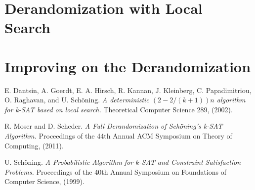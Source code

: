 \documentclass{article}
\begin{document}
\section{Derandomization with Local Search\cite{Dantsin02}}
\section{Improving on the Derandomization\cite{Moser11}}

\begin{thebibliography}{9}
E. Dantsin, A. Goerdt, E. A. Hirsch, R. Kannan, J. Kleinberg, C. Papadimitriou, O. Raghavan, and U. Sch\"{o}ning. 
\textit{A deterministic $(2-2/(k+1))n$ algorithm for k-SAT based on local search.} Theoretical Computer Science 289, (2002).

R. Moser and D. Scheder.
\textit{A Full Derandomization of Sch\"{o}ning’s k-SAT Algorithm.} Proceedings of the 44th Annual ACM Symposium on Theory of Computing, (2011).

U. Sch\"{o}ning.
\textit{A Probabilistic Algorithm for $k$-SAT and Constraint Satisfaction Problems.} Proceedings of the 40th Annual Symposium on Foundations of Computer Science, (1999).

\end{thebibliography}
\end{document}
